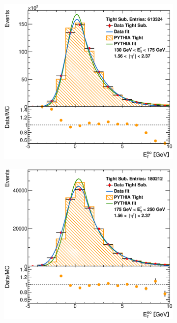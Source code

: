 \documentclass[12pt, twoside]{article}
\numberwithin{equation}{section}
\numberwithin{figure}{section}
\newenvironment{changemargin}[2]{%
\begin{list}{}{%
\setlength{\topsep}{0pt}%
\setlength{\leftmargin}{#1}%
\setlength{\rightmargin}{#2}%
\setlength{\listparindent}{\parindent}%
\setlength{\itemindent}{\parindent}%
\setlength{\parsep}{\parskip}%
}%
\item[]}{\end{list}}
\begin{document}
\begin{figure}[H]
\begin{changemargin}{-1.0cm}{-0.75cm}
\begin{changemargin}{-0.75cm}{-1.0cm}
\begin{subfigure}[b]{0.27\textwidth}
        \end{subfigure}
        \begin{subfigure}[b]{0.27\textwidth}
            \includegraphics[width=\textwidth]{./images/EtISOCorrection/T_MC_FITS-31(10GeV)(After).eps}
        \end{subfigure}
        \begin{subfigure}[b]{0.27\textwidth}
            \includegraphics[width=\textwidth]{./images/EtISOCorrection/T_MC_FITS-32(10GeV)(After).eps}
        \end{subfigure}


\end{changemargin}
\end{changemargin}
\end{figure}
\end{document}
